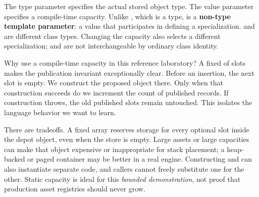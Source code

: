 The type parameter  specifies the actual stored object type. The value parameter  specifies a compile-time capacity. Unlike , which is a type,  is a \textbf{non-type template parameter}: a value that participates in defining a specialization.  and  are different class types. Changing the capacity also selects a different specialization;  and  are not interchangeable by ordinary class identity.

Why use a compile-time capacity in this reference laboratory? A fixed  of  slots makes the publication invariant exceptionally clear. Before an insertion, the next slot is empty. We construct the proposed object there. Only when that construction succeeds do we increment the count of published records. If construction throws, the old published slots remain untouched. This isolates the language behavior we want to learn.

There are tradeoffs. A fixed array reserves storage for every optional slot inside the depot object, even when the store is empty. Large assets or large capacities can make that object expensive or inappropriate for stack placement; a heap-backed or paged container may be better in a real engine. Constructing  and  can also instantiate separate code, and callers cannot freely substitute one for the other. Static capacity is ideal for this \emph{bounded demonstration}, not proof that production asset registries should never grow.


